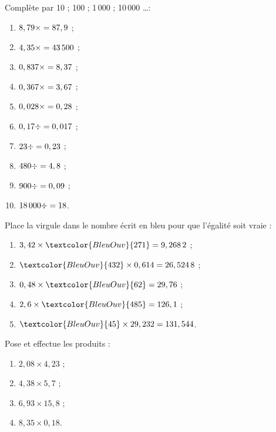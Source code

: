 \begin{exercice}
Complète par 10 ; 100 ; 1\,000 ; 10\,000 \ldots :
\begin{enumerate} 
 \item $8,79 \times \dotfill = 87,9$ ; 
 
 \item $4,35 \times \dotfill = 43\,500$ ; 
 
 \item $0,837 \times \dotfill = 8,37$ ; 
 
 \item $0,367 \times \dotfill = 3,67$ ; 
 
 \item $0,028 \times \dotfill = 0,28$ ; 
 
 \item $0,17 \div \dotfill = 0,017$ ; 
 
 \item $23 \div \dotfill = 0,23$ ; 
 
 \item $480 \div \dotfill = 4,8$ ; 
 
 \item $900 \div \dotfill = 0,09$ ; 
 
 \item \hspace{0.25em}$18\,000 \div \dotfill = 18$. 
 
 \end{enumerate}
\end{exercice}
\begin{exercice}
Place la virgule dans le nombre écrit en \textcolor{BleuOuv}{bleu} pour que l'égalité soit vraie :
\begin{enumerate} 
 \item $3,42 \times \textcolor{BleuOuv}{271} = 9,268\,2$ ;
 \item $\textcolor{BleuOuv}{432} \times 0,614 = 26,524\,8$ ;
 \item $0,48 \times \textcolor{BleuOuv}{62} = 29,76$ ;
 \item $2,6 \times \textcolor{BleuOuv}{485} = 126,1$ ;
 \item $\textcolor{BleuOuv}{45} \times 29,232 = 131,544$.
 \end{enumerate}
\end{exercice}
\begin{exercice}
Pose et effectue les produits :
\begin{enumerate} 
 \item $2,08 \times 4,23$ \dotfill ; 
 
 \item $4,38 \times 5,7$ \dotfill ; 
 
 \item $6,93 \times 15,8$ \dotfill ; 
 
 \item $8,35 \times 0,18 $\dotfill.  
 \end{enumerate}
\end{exercice}
